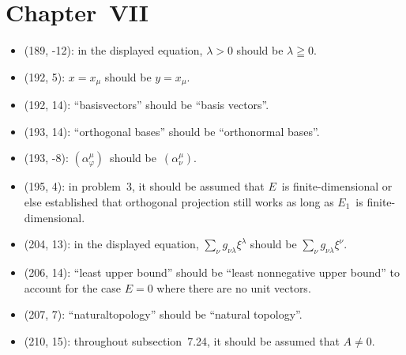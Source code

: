 \documentclass[letterpaper,12pt]{article}
\begin{document}
\section*{Chapter~VII}
\begin{itemize}
\item (189, -12): in the displayed equation, \(\lambda>0\) should be \(\lambda\geqq 0\).
\item (192, 5): \(x=x_{\mu}\) should be \(y=x_{\mu}\).
\item (192, 14): ``basisvectors'' should be ``basis vectors''.
\item (193, 14): ``orthogonal bases'' should be ``orthonormal bases''.
\item (193, -8): \((\alpha^{\mu}_{\varphi})\)~should be~\((\alpha^{\mu}_{\nu})\).
\item (195, 4): in problem~3, it should be assumed that \(E\)~is finite-dimensional or else established that orthogonal projection still works as long as \(E_1\)~is finite-dimensional.
\item (204, 13): in the displayed equation, \(\sum_{\nu}g_{\nu\lambda}\xi^{\lambda}\) should be \(\sum_{\nu}g_{\nu\lambda}\xi^{\nu}\).
\item (206, 14): ``least upper bound'' should be ``least nonnegative upper bound'' to account for the case \(E=0\) where there are no unit vectors.
\item (207, 7): ``naturaltopology'' should be ``natural topology''.
\item (210, 15): throughout subsection~7.24, it should be assumed that \(A\ne 0\).
\end{itemize}
\end{document}
